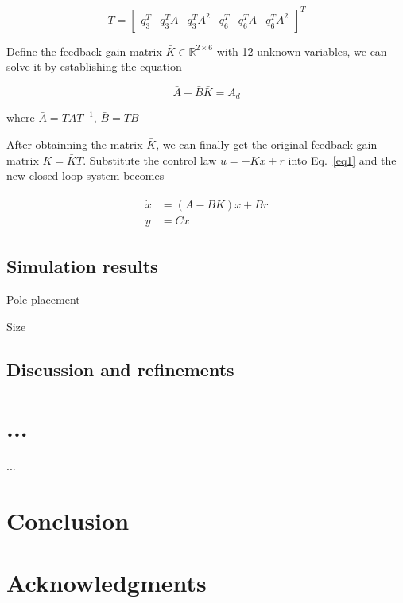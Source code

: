 \documentclass[hyperref]{article}
\theoremstyle{nonumberplain}
\begin{document}
	\begin{equation}
	T=\begin{bmatrix}
	q_{3}^{T} &q_{3}^{T}A  &q_{3}^{T}A^{2}  & q_{6}^{T} &q_{6}^{T}A  &q_{6}^{T}A^{2}
	\end{bmatrix}^{T}
	\label{eq13}
	\end{equation}
	
	Define the feedback gain matrix $\bar{K}\in \mathbb{R}^{2\times 6}$ with 12 unknown variables, we can solve it by establishing the equation
	
	\begin{equation}
	\bar{A}-\bar{B}\bar{K}=A_{d}
	\label{eq14}
	\end{equation}
	
	where $\bar{A}=TAT^{-1}$, $\bar{B}=TB$
	
	After obtainning the matrix $\bar{K}$, we can finally get the original feedback gain matrix $K=\bar{K}T$. Substitute the control law $u=-Kx+r$ into Eq.~\ref{eq1} and the new closed-loop system becomes
	
	\begin{equation}
	\begin{split}
	\begin{aligned}
	\dot{x}&=(A-BK)x+Br \\
	y&=Cx
	\label{eq15}
	\end{aligned}
	\end{split}
	\end{equation}
	
	
	\subsection{Simulation results}
	
	Pole placement
	
	
	Size\cite{b1}
	
	\subsection{Discussion and refinements}
	
	\section{...}
	...
	\section{Conclusion}
	\section*{Acknowledgments}
	
	
	
	{}
	
\end{document}
